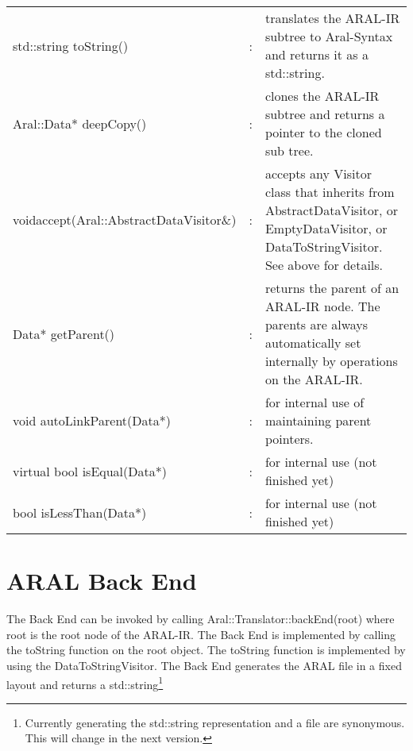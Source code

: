 \begin{tabular}{p{6cm}cp{7.2cm}}
std::string toString()& :& translates the ARAL-IR subtree to Aral-Syntax and
                         returns it as a std::string.\\

Aral::Data* deepCopy()& : &clones the ARAL-IR subtree and returns a
                         pointer to the cloned sub tree.\\
void\newline accept(Aral::AbstractDataVisitor\&)& :& accepts any Visitor class that inherits
                         from AbstractDataVisitor, or EmptyDataVisitor, 
                         or DataToStringVisitor. See above for details.\\
Data* getParent()   &  :& returns the parent of an ARAL-IR node. The parents are always
                         automatically set internally by operations on the ARAL-IR.\\

void autoLinkParent(Data*)& : &for internal use of maintaining parent pointers.\\
virtual bool isEqual(Data*)&: &for internal use (not finished yet)\\
bool isLessThan(Data*)     &:& for internal use (not finished yet)\\
\end{tabular}

\section{ARAL Back End}

The Back End can be invoked by calling Aral::Translator::backEnd(root)
where root is the root node of the ARAL-IR. The Back End is
implemented by calling the toString function on the root object. The
toString function is implemented by using the DataToStringVisitor.
The Back End generates the ARAL file in a fixed layout and returns a
std::string\footnote{Currently generating the std::string representation and a file
are synonymous. This will change in the next version.}
